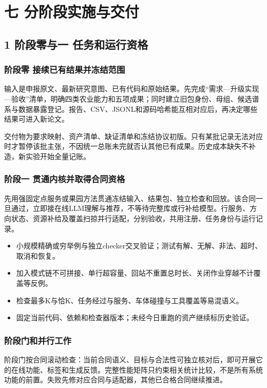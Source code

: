\documentclass[11pt,a4paper]{article}
\newcommand{\bodytext}[1]{#1\par}
\begin{document}
\section{七 分阶段实施与交付}
\subsection{1  阶段零与一 任务和运行资格}
\subsubsection{阶段零 接续已有结果并冻结范围}
\bodytext{输入是申报原文、最新研究意图、已有代码和原始结果。先完成“需求—升级实现—验收”清单，明确四类农业能力和五项成果；同时建立旧包身份、母组、候选谱系与数据暴露登记。报告、CSV、JSONL和源码哈希能互相对应后，再决定哪些结果可进入新论文。}
\bodytext{交付物为要求映射、资产清单、缺证清单和冻结协议初版。只有某批记录无法对应时才暂停该批主张，不因统一总账未完就否认其他已有成果。历史成本缺失不补造，新实验开始全量记账。}
\subsubsection{阶段一 贯通内核并取得合同资格}
\bodytext{先用强固定点服务或果园方法贯通冻结输入、结果包、独立检查和回放。该合同一旦通过，立即接在线LLM理解与推荐，不等待完整库或行补给模型。行服务、方向状态、资源补给及覆盖扫掠并行适配，分别验收，共用注册、任务身份与运行记录。}
\begin{itemize}
\item 小规模精确或穷举例与独立checker交叉验证；测试有解、无解、非法、超时、取消和恢复。
\item 加入模式链不可拼接、单行超容量、回站不重置总时长、关闭作业穿越不计覆盖等反例。
\item 检查最多K与恰K、任务经过与服务、车体碰撞与工具覆盖等易混语义。
\item 固定当前代码、依赖和检查器版本；未经今日重跑的资产继续标历史验证。
\end{itemize}
\subsubsection{阶段门和并行工作}
\bodytext{阶段门按合同滚动检查：当前合同语义、目标与合法性可独立核对后，即可开展它的在线功能、标签和生成反馈。完整性能矩阵只约束相关统计比较，不是所有系统功能的前置。失败先修对应合同与适配器，其他已合格合同继续推进。}
\end{document}

